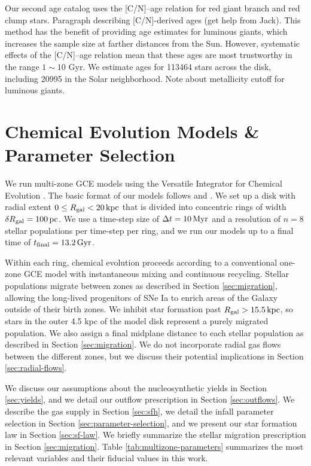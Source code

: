 \documentclass[twocolumn,twocolappendix,linenumbers]{aastex631}
\newcommand{\todo}[1]{{\color{red}#1}}
\begin{document}
Our second age catalog uses the [C/N]--age relation for red giant branch and red clump stars. 
\todo{Paragraph describing [C/N]-derived ages (get help from Jack).}
This method has the benefit of providing age estimates for luminous giants, which increases the sample size at farther distances from the Sun. However, systematic effects of the [C/N]--age relation mean that these ages are most trustworthy in the range $1\sim10$ Gyr. We estimate ages for \num{113464} stars across the disk, including \num{20995} in the Solar neighborhood.
\todo{Note about metallicity cutoff for luminous giants.}

\section{Chemical Evolution Models \& Parameter Selection}
\label{sec:methods}

We run multi-zone GCE models using the Versatile Integrator for Chemical Evolution \citep[{\tt VICE};][]{johnson_impact_2020}. The basic format of our models follows \citet{johnson_stellar_2021} and \citet{dubay_galactic_2024}. We set up a disk with radial extent $0\leq R_{\rm gal}<20\,{\rm kpc}$ that is divided into concentric rings of width $\delta R_{\rm gal}=100\,{\rm pc}$. We use a time-step size of $\Delta t=10\,{\rm Myr}$ and a resolution of $n=8$ stellar populations per time-step per ring, and we run our models up to a final time of $t_{\rm final}=13.2\,{\rm Gyr}$.

Within each ring, chemical evolution proceeds according to a conventional one-zone GCE model with instantaneous mixing and continuous recycling. Stellar populations migrate between zones as described in Section \ref{sec:migration}, allowing the long-lived progenitors of SNe Ia to enrich areas of the Galaxy outside of their birth zones. We inhibit star formation past $R_{\rm gal}>15.5\,{\rm kpc}$, so stars in the outer 4.5 kpc of the model disk represent a purely migrated population. We also assign a final midplane distance to each stellar population as described in Section \ref{sec:migration}. We do not incorporate radial gas flows between the different zones, but we discuss their potential implications in Section \ref{sec:radial-flows}.

We discuss our assumptions about the nucleosynthetic yields in Section \ref{sec:yields}, and we detail our outflow prescription in Section \ref{sec:outflows}. We describe the gas supply in Section \ref{sec:sfh}, we detail the infall parameter selection in Section \ref{sec:parameter-selection}, and we present our star formation law in Section \ref{sec:sf-law}. We briefly summarize the stellar migration prescription in Section \ref{sec:migration}. Table \ref{tab:multizone-parameters} summarizes the most relevant variables and their fiducial values in this work.
\end{document}
